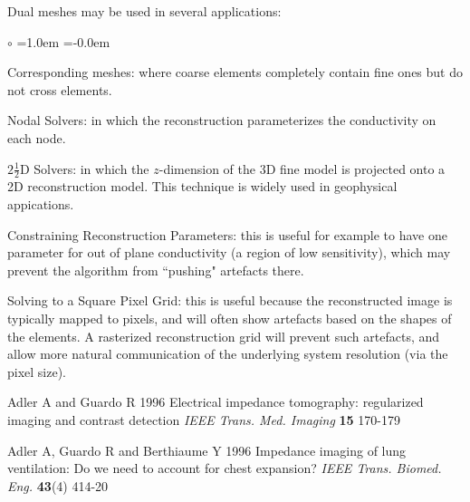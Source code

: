 \documentclass[12pt,draft]{iopart}
\begin{document}
Dual meshes may be used in several applications:
\begin{list}{$\circ$} %
  {\leftmargin=1.0em \itemindent=-0.0em
    \baselineskip
    \baselineskip}
\item
   Corresponding meshes: where 
   coarse elements completely contain fine ones but do not
   cross elements.
\item
   Nodal Solvers: in which the reconstruction parameterizes
   the conductivity on each node\cite{graham2006}.
\item
   $2\frac{1}{2}$D Solvers: in which the $z$-dimension of the
     3D fine model is projected onto a 2D reconstruction model.
     This technique is widely used in geophysical appications.
\item
   Constraining Reconstruction Parameters:
      this is useful for example to have one parameter
      for out of plane conductivity (a region of low sensitivity),
      which may prevent the algorithm from ``pushing" artefacts there.
\item
   Solving to a Square Pixel Grid: this is useful because the
       reconstructed image is typically mapped to pixels, and
       will often show artefacts based on the shapes of the elements.
       A rasterized reconstruction grid will prevent such
       artefacts, and allow more natural communication of the
       underlying system resolution (via the pixel size).
\end{list}


%



\References %
\item[]
Adler A and Guardo R 1996 Electrical impedance tomography:
regularized imaging and contrast detection {\em IEEE Trans. Med.
Imaging} {\bf 15} 170-179

\item[]
Adler A, Guardo R and Berthiaume Y 1996 Impedance imaging of lung
ventilation: Do we need to account for chest expansion? {\em IEEE
Trans. Biomed. Eng.} {\bf 43}(4) 414-20
\end{document}
